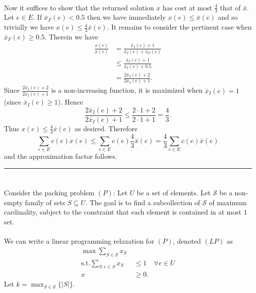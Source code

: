 \documentclass[letterpaper,12pt,oneside,onecolumn]{article}
\newcommand{\cS}{\mathcal{S}} \newcommand{\cT}{\mathcal{T}}
\newenvironment{proof}{{\bf Proof:  }}{\hfill\rule{2mm}{2mm}}
\begin{document}
\begin{proof}
\paragraph{}
Now it suffices to show that the returned solution $x$ has cost at most $\frac{4}{3}$ that of $\bar{x}$. Let $e \in E$. If $\bar{x}_F(e) < 0.5$ then we have immediately $x(e) \leq \bar{x}(e)$ and so trivially we have $x(e) \leq \frac{4}{3}\bar{x}(e)$. It remains to consider the pertinent case when $\bar{x}_F(e) \geq 0.5$. Therein we have
\begin{align*}
\frac{x(e)}{\bar{x}(e)} &= \frac{\bar{x}_I(e) + 1}{\bar{x}_I(e) + \bar{x}_F(e)} \\
&\leq  \frac{\bar{x}_I(e) + 1}{\bar{x}_I(e) +0.5} \\
&= \frac{2\bar{x}_I(e) + 2}{2\bar{x}_I(e) + 1}.
\end{align*}
Since $\frac{2\bar{x}_I(e) + 2}{2\bar{x}_I(e) + 1}$ is a non-increasing function, it is maximized when $\bar{x}_I(e) = 1$ (since $\bar{x}_I(e) \geq 1$). Hence
$$\frac{2\bar{x}_I(e) + 2}{2\bar{x}_I(e) + 1} \leq \frac{2\cdot 1 + 2}{2\cdot 1 + 1} = \frac{4}{3}.$$
Thus $x(e) \leq \frac{4}{3}\bar{x}(e)$ as desired. Therefore
$$\sum_{e\in E}c(e) x(e) \leq \sum_{e \in E}c(e)\frac{4}{3}\bar{x}(e) = \frac{4}{3}\sum_{e\in E}c(e)\bar{x}(e)$$
and the approximation factor follows.
\end{proof}

\section{}
\paragraph{}
Consider the packing problem $(P)$: Let $U$ be a set of elements. Let $\cS$ be a non-empty family of sets $S\subseteq U$. The goal is to find a subcollection of $\cS$ of maximum cardinality, subject to the constraint that each element is contained in at most $1$ set.
\paragraph{}
We can write a linear programming relaxation for $(P)$, denoted $(LP)$ as
\begin{align*}
\max \sum_{S\in\cS} x_S\ & \\
\text{s.t.} \sum_{S:e\in S} x_S &\leq 1 &\forall e\in U \\
x&\geq 0.
\end{align*}
Let $k = \max_{S\in \cS} \{ |S|\}$.
\end{document}
